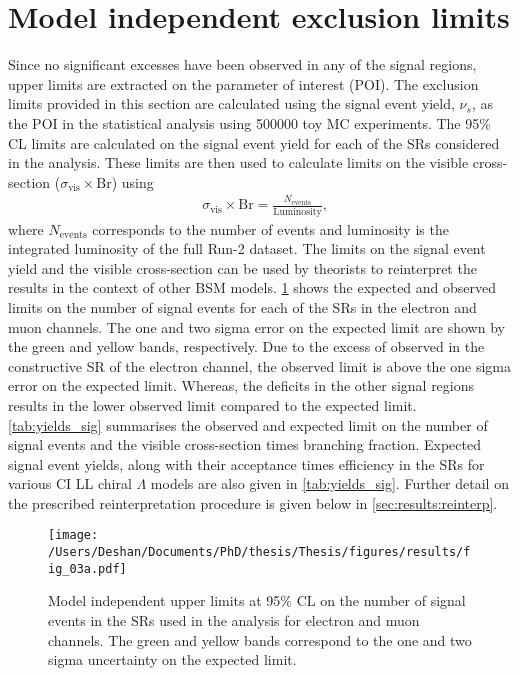 \section{Model independent exclusion limits}\label{sec:results:modelindep}
Since no significant excesses have been observed in any of the signal regions, upper limits are extracted on the parameter of interest (POI). The exclusion limits provided in this section are calculated using the signal event yield, $\nu_s$, as the POI in the statistical analysis using 500000 toy MC experiments. The 95\% CL limits are calculated on the signal event yield for each of the SRs considered in the analysis. These limits are then used to calculate limits on the visible cross-section ($\sigma_\textrm{vis}\times\textrm{Br}$) using
\begin{equation}
    \label{eq:visxs}
    \begin{aligned}
        & \sigma_\textrm{vis}\times\textrm{Br} = \frac{N_{\mathrm{events}}}{\mathrm{Luminosity}},
    \end{aligned}
\end{equation}
where $N_{\mathrm{events}}$ corresponds to the number of events and luminosity is the integrated luminosity of the full Run-2 dataset. The limits on the signal event yield and the visible cross-section can be used by theorists to reinterpret the results in the context of other BSM models. \cref{fig:limit_n} shows the expected and observed limits on the number of signal events  for each of the SRs in the electron and muon channels. The one and two sigma error on the expected limit are shown by the green and yellow bands, respectively. Due to the excess of observed in the constructive SR of the electron channel, the observed limit is above the one sigma error on the expected limit. Whereas, the deficits in the other signal regions results in the lower observed limit compared to the expected limit. \cref{tab:yields_sig} summarises the observed and expected limit on the number of signal events and the visible cross-section times branching fraction. Expected signal event yields, along with their acceptance times efficiency in the SRs for various CI LL chiral $\Lambda$ models are also given in \cref{tab:yields_sig}. Further detail on the prescribed reinterpretation procedure is given below in \cref{sec:results:reinterp}.

\begin{figure}[!htpb]

    \centering
    \texttt{[image: /Users/Deshan/Documents/PhD/thesis/Thesis/figures/results/fig\_03a.pdf]}
    \label{fig:limit_n1}
    \caption[Model independent upper limits at 95\% CL on the number of signal events in the SRs used in the analysis for electron and muon channels.]{Model independent upper limits at 95\% CL on the number of signal events in the SRs used in the analysis for electron and muon channels. The green and yellow bands correspond to the one and two sigma uncertainty on the expected limit.}
    \label{fig:limit_n}
\end{figure}

